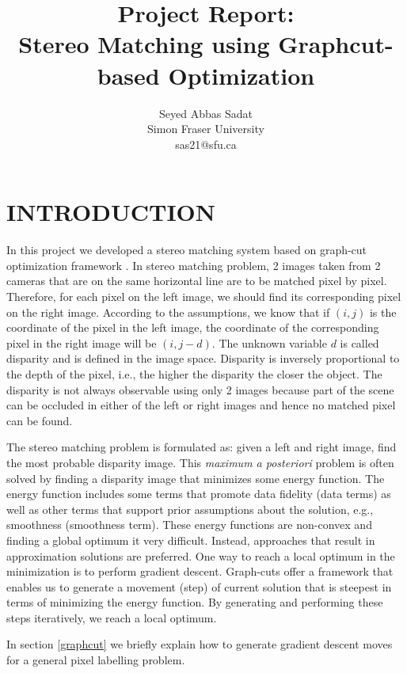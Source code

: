 \documentclass[letterpaper, 10 pt, conference]{ieeeconf}  %
\title{Project Report:\\\LARGE \bf
Stereo Matching using Graphcut-based Optimization}
\author{Seyed Abbas Sadat\\
Simon Fraser University\\
sas21@sfu.ca%
}
\begin{document}
\maketitle
\thispagestyle{empty}
\pagestyle{empty}


\section{INTRODUCTION}

In this project we developed a stereo matching system based on graph-cut optimization framework \cite{boykov2001fast}. In stereo matching problem, 2 images taken from 2 cameras that are on the same horizontal line are to be matched pixel by pixel. Therefore, for each pixel on the left image, we should find its corresponding pixel on the right image. According to the assumptions, we know that if $(i,j)$ is the coordinate of the pixel in the left image, the coordinate of the corresponding pixel in the right image will be $(i,j-d)$. The unknown variable $d$ is called disparity and is defined in the image space. Disparity is inversely proportional to the depth of the pixel, i.e., the higher the disparity the closer the object. The disparity is not always observable using only 2 images because part of the scene can be occluded in either of the left or right images and hence no matched pixel can be found.

The stereo matching problem is formulated as: given a left and right image, find the most probable disparity image. This \emph{maximum a posteriori} problem is often solved by finding a disparity image that minimizes some energy function. The energy function includes some terms that promote data fidelity (data terms) as well as other terms that support prior assumptions about the solution, e.g., smoothness (smoothness term). These energy functions are non-convex and finding a global optimum it very difficult. Instead, approaches that result in approximation solutions are preferred. One way to reach a local optimum in the minimization is to perform gradient descent. Graph-cuts offer a framework that enables us to generate a movement (step) of current solution that is steepest in terms of minimizing the energy function. By generating and performing these steps iteratively, we reach a local optimum. 

In section \ref{graphcut} we briefly explain how to generate gradient descent moves for a general pixel labelling problem.
\end{document}

